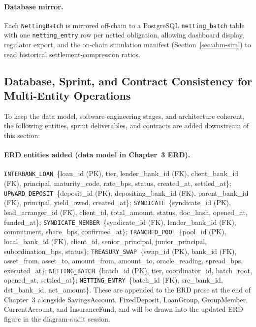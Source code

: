 \documentclass[12pt,a4paper]{report}
\begin{document}
\paragraph{Database mirror.}
Each \texttt{NettingBatch} is mirrored off-chain to a PostgreSQL \texttt{netting\_batch} table with one \texttt{netting\_entry} row per netted obligation, allowing dashboard display, regulator export, and the on-chain simulation manifest (Section~\ref{sec:abm-sim}) to read historical settlement-compression ratios.

\subsection{Database, Sprint, and Contract Consistency for Multi-Entity Operations}
\label{sec:multi-entity-consistency}

To keep the data model, software-engineering stages, and architecture coherent, the following entities, sprint deliverables, and contracts are added downstream of this section:

\paragraph{ERD entities added (data model in Chapter~3 ERD).}
\texttt{INTERBANK\_LOAN}~\{loan\_id (PK), tier, lender\_bank\_id (FK), client\_bank\_id (FK), principal, maturity\_code, rate\_bps, status, created\_at, settled\_at\}; \texttt{UPWARD\_DEPOSIT}~\{deposit\_id (PK), depositing\_bank\_id (FK), parent\_bank\_id (FK), principal, yield\_owed, created\_at\}; \texttt{SYNDICATE}~\{syndicate\_id (PK), lead\_arranger\_id (FK), client\_id, total\_amount, status, doc\_hash, opened\_at, funded\_at\}; \texttt{SYNDICATE\_MEMBER}~\{syndicate\_id (FK), lender\_bank\_id (FK), commitment, share\_bps, confirmed\_at\}; \texttt{TRANCHED\_POOL}~\{pool\_id (PK), local\_bank\_id (FK), client\_id, senior\_principal, junior\_principal, subordination\_bps, status\}; \texttt{TREASURY\_SWAP}~\{swap\_id (PK), bank\_id (FK), asset\_from, asset\_to, amount\_from, amount\_to, oracle\_reading, spread\_bps, executed\_at\}; \texttt{NETTING\_BATCH}~\{batch\_id (PK), tier, coordinator\_id, batch\_root, opened\_at, settled\_at\}; \texttt{NETTING\_ENTRY}~\{batch\_id (FK), src\_bank\_id, dst\_bank\_id, net\_amount\}. These are appended to the ERD prose at the end of Chapter~3 alongside SavingsAccount, FixedDeposit, LoanGroup, GroupMember, CurrentAccount, and InsuranceFund, and will be drawn into the updated ERD figure in the diagram-audit session.
\end{document}
